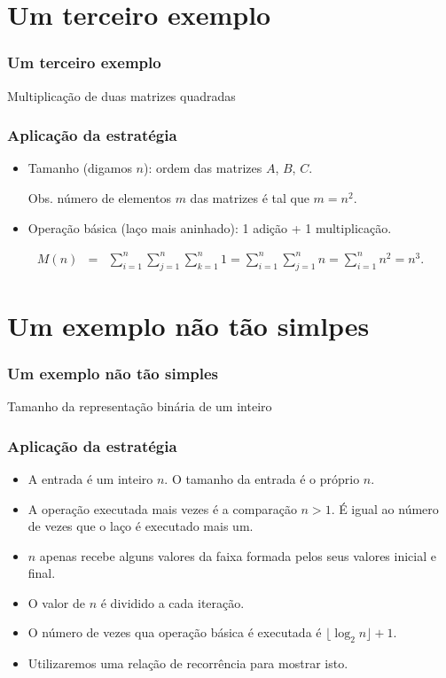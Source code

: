 \documentclass[handout]{beamer}
\begin{document}
\section{Um terceiro exemplo}
\begin{frame}
\frametitle{Um terceiro exemplo}
\begin{example}{Multiplicação de duas matrizes quadradas}

\end{example}
\end{frame}

\begin{frame}
\frametitle{Aplicação da estratégia}

\begin{small}

\end{small}

\begin{itemize}
\item Tamanho (digamos $n$): ordem das matrizes $A$, $B$, $C$.

  Obs. número de elementos $m$ das matrizes é tal que $m = n^2$.
\item Operação básica (laço mais aninhado): 1 adição + 1 multiplicação. 
\end{itemize}
\begin{eqnarray*}
M(n) & = & \sum_{i=1}^n \sum_{j=1}^{n} \sum_{k=1}^n 1 = \sum_{i=1}^n \sum_{j=1}^{n} n = \sum_{i=1}^n n^2 = n^3. 
\end{eqnarray*}
\end{frame}

\section{Um exemplo não tão simlpes}
\begin{frame}
\frametitle{Um exemplo não tão simples}
\begin{example}{Tamanho da representação binária de um inteiro}

\end{example}
\end{frame}

\begin{frame}
\frametitle{Aplicação da estratégia}
\begin{footnotesize}

\end{footnotesize}
\begin{itemize}
\item A entrada é um inteiro $n$. O tamanho da entrada é o próprio $n$.
\item A operação executada mais vezes é a comparação $n > 1$. É igual
ao número de vezes que o laço é executado mais um.
\item $n$ apenas recebe alguns valores da faixa formada pelos seus valores
  inicial e final.
\item O valor de $n$ é dividido a cada iteração. 
\item O número de vezes qua operação básica é executada é $\lfloor \log_2 n \rfloor + 1$.
\item Utilizaremos uma \alert{relação de recorrência} para mostrar isto.
\end{itemize}
\end{frame}
\end{document}
